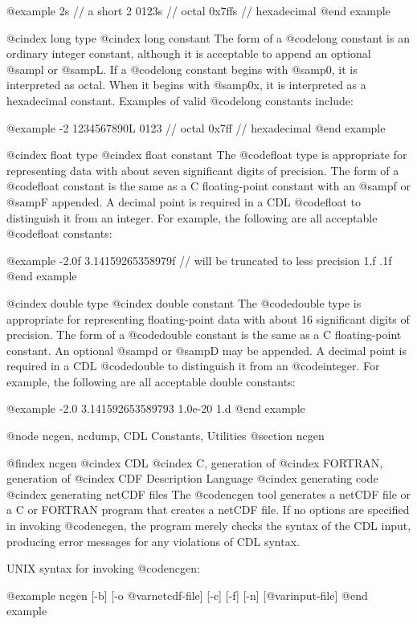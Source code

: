 {@example
2s      // a short 2
0123s   // octal
0x7ffs  // hexadecimal
@end example

@cindex long type
@cindex long constant
The form of a @code{long} constant is an ordinary integer constant,
although it is acceptable to append an optional @samp{l} or @samp{L}.
If a @code{long} constant begins with @samp{0}, it is interpreted as
octal.  When it begins with @samp{0x}, it is interpreted as a
hexadecimal constant.  Examples of valid @code{long} constants include:

@example
-2
1234567890L
0123            // octal
0x7ff           // hexadecimal
@end example

@cindex float type
@cindex float constant
The @code{float} type is appropriate for representing
data with about seven significant digits of precision.
The form of a @code{float} constant is the same as a C floating-point constant
with an @samp{f} or @samp{F} appended.  A decimal point is required in a CDL
@code{float} to distinguish it from an integer.  For example,
the following are all acceptable @code{float} constants:

@example
-2.0f
3.14159265358979f       // will be truncated to less precision
1.f
.1f
@end example

@cindex double type
@cindex double constant
The @code{double} type is appropriate for representing floating-point
data with about 16 significant digits of precision.  The form of a
@code{double} constant is the same as a C floating-point constant.  An
optional @samp{d} or @samp{D} may be appended.  A decimal point is
required in a CDL @code{double} to distinguish it from an
@code{integer}.  For example, the following are all acceptable double
constants:

@example
-2.0
3.141592653589793
1.0e-20
1.d
@end example

@node ncgen, ncdump, CDL Constants, Utilities
@section ncgen

@findex ncgen
@cindex CDL
@cindex C, generation of
@cindex FORTRAN, generation of
@cindex CDF Description Language
@cindex generating code
@cindex generating netCDF files
The @code{ncgen} tool generates a netCDF file or a C or FORTRAN
program that creates a netCDF file.  If no options are
specified in invoking @code{ncgen}, the program merely checks the
syntax of the CDL input, producing error messages for any violations
of CDL syntax.

UNIX syntax for invoking @code{ncgen}:

@example
ncgen [-b] [-o @var{netcdf-file}] [-c] [-f] [-n] [@var{input-file}]
@end example

}
